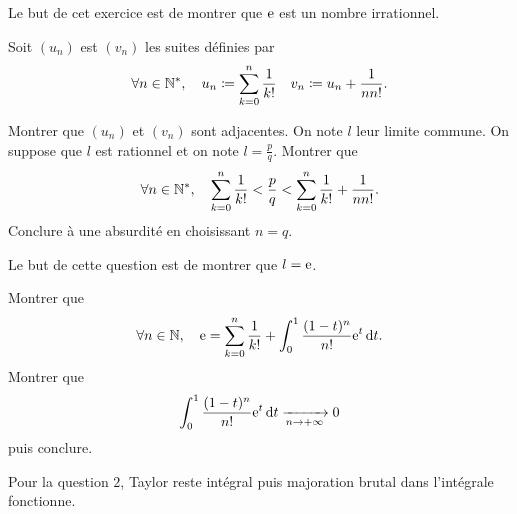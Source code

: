 \documentclass{magnolia}
\begin{document}
Le but de cet exercice est de montrer que ${\rm e}$ est un nombre irrationnel.
\begin{questions}
\question Soit $(u_n)$ est $(v_n)$ les suites définies par
  $$\forall n\in{\mathbb{N}^*} ,\quad u_n\coloneqq\sum_{k=0}^{n} \frac{1}{k!}
    \quad v_n\coloneqq u_n+\frac{1}{n n!}.$$
  \begin{questions}
  \question Montrer que $(u_n)$ et $(v_n)$ sont adjacentes.
  \question On note $l$ leur limite commune. On suppose que $l$ est rationnel
    et on note $l=\frac{p}{q}$. Montrer que
    $$\forall n\in{\mathbb{N}^*} ,\quad \sum_{k=0}^{n} \frac{1}{k!} < \frac{p}{q}
      < \sum_{k=0}^{n} \frac{1}{k!} + \frac{1}{n n!}.$$
  \question Conclure à une absurdité en choisissant $n=q$.
  \end{questions}
\question Le but de cette question est de montrer que $l={\rm e}$.
  \begin{questions}
  \question Montrer que
    $$\forall n \in\mathbb{N} ,\quad {\rm e}=\sum_{k=0}^n \frac{1}{k!}+\int_{0}^{1} \frac{(1-t)^n}{n!} {\rm e}^t\,\text{d}t.$$
  \question Montrer que
    $$\int_{0}^{1} \frac{(1-t)^n}{n!} {\rm e}^t\,\text{d}t
    \xrightarrow[n \rightarrow +\infty]{} 0$$
    puis conclure.
  \end{questions}
\end{questions}
\begin{sol}
Pour la question $2$, Taylor reste intégral puis majoration brutal dans l'intégrale fonctionne.
\end{sol}


\end{document}
